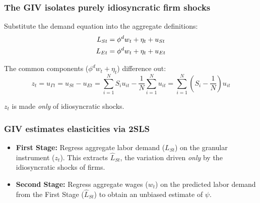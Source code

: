 \documentclass[aspectratio=169,11pt]{beamer}
\begin{document}
\begin{frame} \label{src_equal_weighted}
    \frametitle{The GIV isolates purely idiosyncratic firm shocks}

    \vspace{0.5cm}
    Substitute the demand equation into the aggregate definitions: \hyperlink{app_size_weighted}{}
    \begin{align}
        L_{St} & = \phi^d w_t + \eta_t + u_{St} \notag \\
        L_{Et} & = \phi^d w_t + \eta_t + u_{Et} \notag
    \end{align}

    \vspace{0.5cm}
    The common components ($\phi^d w_t + \eta_t$) difference out:
    \begin{equation}
        z_t = u_{\Gamma t} = u_{St} - u_{Et} = \sum_{i=1}^N S_i u_{it} - \frac{1}{N} \sum_{i=1}^N u_{it} = \sum_{i=1}^N (S_i - \frac{1}{N}) u_{it} \tag{GIV}
    \end{equation}

    \vspace{0.5cm}
    {\Large
        $z_t$ is made \emph{only} of idiosyncratic shocks.
    }

\end{frame}

\begin{frame}
    \frametitle{GIV estimates elasticities via 2SLS}
    \begin{itemize}
        \item \large{\textbf{First Stage:} Regress aggregate labor demand ($L_{St}$) on the granular instrument ($z_t$). This extracts $\widehat{L}_{St}$, the variation driven \emph{only} by the idiosyncratic shocks of firms.}
              \vspace{0.5cm}
        \item \large{\textbf{Second Stage:} Regress aggregate wages ($w_t$) on the predicted labor demand from the First Stage ($\widehat{L}_{St}$) to obtain an unbiased estimate of $\psi$.}
    \end{itemize}

\end{frame}
\end{document}
